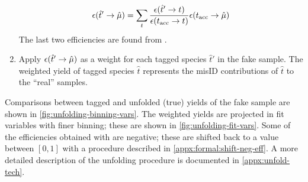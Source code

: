 \begin{enumerate}
        \begin{equation}
            \misEff[\hat{t}']{\hat{\mu}} =
                \sum_{t}
                \frac{\misEff[\hat{t}']{t}}{\misEff[t_\text{acc}]{t}}
                \misEff[t_\text{acc}]{\hat{\mu}}
        \end{equation}
        The last two efficiencies are found from \pidcalib.

    \item Apply $\misEff[\hat{t}']{\hat{\mu}}$ as a weight for each
        tagged species $\hat{t}'$ in the fake \muon sample.
        The weighted yield of tagged species $\hat{t}$ represents the \muon misID
        contributions of $\hat{t}$ to the ``real'' \muon samples.
\end{enumerate}

Comparisons between tagged and unfolded (true) yields of the fake \muon sample
are shown in \cref{fig:unfolding-binning-vars}.
The weighted yields are projected in fit variables with finer binning;
these are shown in \cref{fig:unfolding-fit-vars}.
Some of the efficiencies obtained with \pidcalib are negative; these are shifted
back to a value between $[0, 1]$ with a procedure described in
\cref{appx:formal:shift-neg-eff}.
A more detailed description of the unfolding procedure is documented in
\cref{appx:unfold-tech}.

